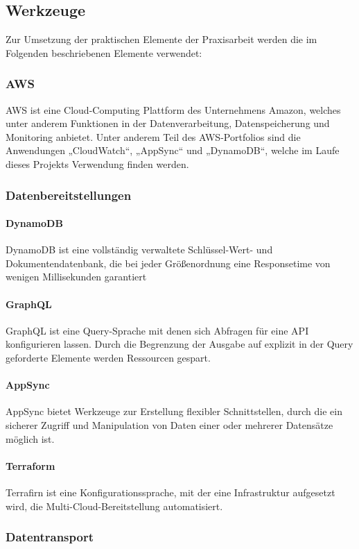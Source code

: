 \subsection{Werkzeuge} 
Zur Umsetzung der praktischen Elemente der Praxisarbeit werden die im Folgenden beschriebenen Elemente verwendet: 
\subsubsection{AWS} 
AWS ist eine Cloud-Computing Plattform des Unternehmens Amazon, welches unter anderem Funktionen in der Datenverarbeitung, Datenspeicherung und Monitoring anbietet. Unter anderem Teil des AWS-Portfolios sind die Anwendungen „CloudWatch“, „AppSync“ und „DynamoDB“, welche im Laufe dieses Projekts Verwendung finden werden. \cite{Baron2017} 
\subsubsection{Datenbereitstellungen}
\paragraph{DynamoDB} 
DynamoDB ist eine vollständig verwaltete Schlüssel-Wert- und Dokumentendatenbank, die bei jeder Größenordnung eine Responsetime von wenigen Millisekunden garantiert \paragraph{GraphQL} 
GraphQL ist eine Query-Sprache mit denen sich Abfragen für eine API konfigurieren lassen. Durch die Begrenzung der Ausgabe auf explizit in der Query geforderte Elemente werden Ressourcen gespart. \cite{Porcello2018}

\paragraph{AppSync} 
AppSync bietet Werkzeuge zur Erstellung flexibler Schnittstellen, durch die ein sicherer Zugriff und Manipulation von Daten einer oder mehrerer Datensätze möglich ist. \paragraph{Terraform} 
Terrafirn ist eine Konfigurationssprache, mit der eine Infrastruktur aufgesetzt wird, die Multi-Cloud-Bereitstellung automatisiert. \cite{Brikman2019} 
\subsubsection{Datentransport}
